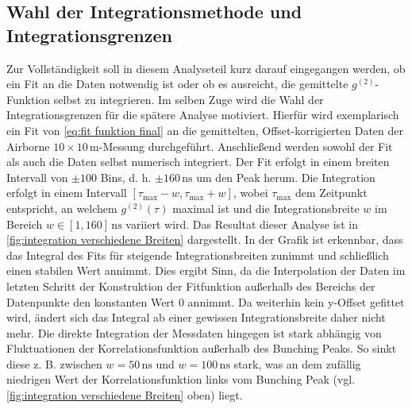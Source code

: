 \subsection{Wahl der Integrationsmethode und Integrationsgrenzen}
\label{ssec:Wahl der Integrationsmethode}
Zur Vollständigkeit soll in diesem Analyseteil kurz darauf eingegangen werden, ob ein Fit an die Daten notwendig ist oder ob es ausreicht, die gemittelte $g^{(2)}$-Funktion selbst zu integrieren. 
Im selben Zuge wird die Wahl der Integrationsgrenzen für die spätere Analyse motiviert. 
Hierfür wird exemplarisch ein Fit von \autoref{eq:fit funktion final} an die gemittelten, Offset-korrigierten Daten der Airborne $10\times 10\,\mathrm{m}$-Messung durchgeführt. 
Anschließend werden sowohl der Fit als auch die Daten selbst numerisch integriert. 
Der Fit erfolgt in einem breiten Intervall von $\pm 100$ Bins, d. h. $\pm 160\,\mathrm{ns}$ um den Peak herum. 
Die Integration erfolgt in einem Intervall $[\tau_{\mathrm{max}}-w, \tau_{\mathrm{max}}+w]$, wobei $\tau_{\mathrm{max}}$ dem Zeitpunkt entspricht, an welchem $g^{(2)}(\tau)$ maximal ist und die Integrationsbreite $w$ im Bereich $w\in [1,160]\,\mathrm{ns}$ variiert wird. 
Das Resultat dieser Analyse ist in \autoref{fig:integration verschiedene Breiten} dargestellt. 
In der Grafik ist erkennbar, dass das Integral des Fits für steigende Integrationsbreiten zunimmt und schließlich einen stabilen Wert annimmt. 
Dies ergibt Sinn, da die Interpolation der Daten im letzten Schritt der Konstruktion der Fitfunktion außerhalb des Bereichs der Datenpunkte den konstanten Wert 0 annimmt. 
Da weiterhin kein y-Offset gefittet wird, ändert sich das Integral ab einer gewissen Integrationsbreite daher nicht mehr. 
Die direkte Integration der Messdaten hingegen ist stark abhängig von Fluktuationen der Korrelationsfunktion außerhalb des Bunching Peaks. 
So sinkt diese z. B. zwischen $w=50\,\mathrm{ns}$ und $w=100\,\mathrm{ns}$ stark, was an dem zufällig niedrigen Wert der Korrelationsfunktion links vom Bunching Peak (vgl. \autoref{fig:integration verschiedene Breiten} oben) liegt. \\

